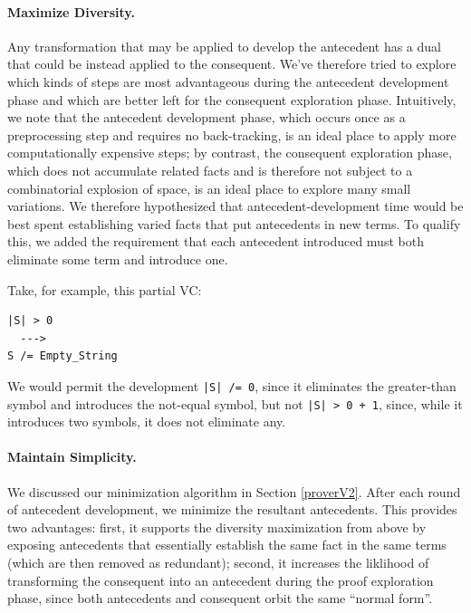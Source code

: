 \paragraph{Maximize Diversity.}  Any transformation that may be applied to develop the antecedent has a dual that could be instead applied to the consequent.  We've therefore tried to explore which kinds of steps are most advantageous during the antecedent development phase and which are better left for the consequent exploration phase.  Intuitively, we note that the antecedent development phase, which occurs once as a preprocessing step and requires no back-tracking, is an ideal place to apply more computationally expensive steps; by contrast, the consequent exploration phase, which does not accumulate related facts and is therefore not subject to a combinatorial explosion of space, is an ideal place to explore many small variations.  We therefore hypothesized that antecedent-development time would be best spent establishing varied facts that put antecedents in new terms.  To qualify this, we added the requirement that each antecedent introduced must both eliminate some term and introduce one.

Take, for example, this partial VC:

\begin{lstlisting}
|S| > 0
  --->
S /= Empty_String
\end{lstlisting}

We would permit the development \texttt{|S| /= 0}, since it eliminates the greater-than symbol and introduces the not-equal symbol, but not \texttt{|S| > 0 + 1}, since, while it introduces two symbols, it does not eliminate any.

\paragraph{Maintain Simplicity.}  We discussed our minimization algorithm in Section \ref{proverV2}.  After each round of antecedent development, we minimize the resultant antecedents.  This provides two advantages: first, it supports the diversity maximization from above by exposing antecedents that essentially establish the same fact in the same terms (which are then removed as redundant); second, it increases the liklihood of transforming the consequent into an antecedent during the proof exploration phase, since both antecedents and consequent orbit the same ``normal form''.


